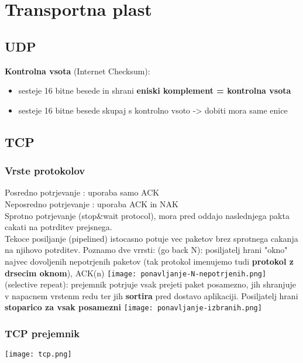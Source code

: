 \section{Transportna plast}

\subsection{UDP}
\textbf{Kontrolna vsota} (Internet Checksum): 
\begin{itemize}[leftmargin=*,noitemsep]
    \item {} sesteje 16 bitne besede in shrani \textbf{eniski komplement = kontrolna vsota}
    \item {} sesteje 16 bitne besede skupaj s kontrolno vsoto -> dobiti mora same enice
\end{itemize}



\subsection{TCP}

\subsubsection{Vrste protokolov}
\color{green} Posredno potrjevanje \color{black}: uporaba samo ACK\\
\color{green} Neposredno potrjevanje \color{black}: uporaba ACK in NAK\\
\color{green} Sprotno potrjevanje \color{black} (stop\&wait protocol), mora pred oddajo naslednjega pakta cakati na potrditev prejsnega.\\
\color{green} Tekoce posiljanje \color{black} (pipelined) istocasno potuje vec paketov brez sprotnega cakanja na njihovo potrditev. Poznamo dve vrrsti:
 (go back N): posiljatelj hrani "okno" najvec dovoljenih nepotrjenih paketov (tak protokol imenujemo tudi \textbf{protokol z drsecim oknom}), ACK(n)
\texttt{[image: ponavljanje-N-nepotrjenih.png]}\\
 (selective repeat): prejemnik potrjuje vsak prejeti paket posamezno, jih shranjuje v napacnem vrstenm redu ter jih \textbf{sortira} pred dostavo aplikaciji. Posiljatelj hrani \textbf{stoparico za vsak posamezni}
\texttt{[image: ponavljanje-izbranih.png]}

\subsubsection{TCP prejemnik}
\texttt{[image: tcp.png]}


